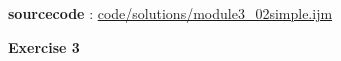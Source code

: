 \textbf{sourcecode} : \href{http://www.example.com/contents}{code/solutions/module3\_02simple.ijm}
\item \textbf{Exercise 3}